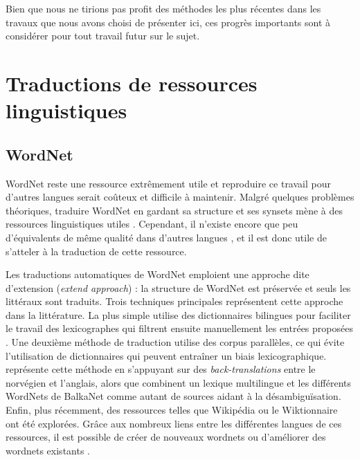 Bien que nous ne tirions pas profit des méthodes les plus récentes dans les
travaux que nous avons choisi de présenter ici, ces progrès importants sont à
considérer pour tout travail futur sur le sujet.

\section{Traductions de ressources linguistiques}
\label{sec:translation}

\subsection{WordNet}

WordNet reste une ressource extrêmement utile et reproduire ce travail pour
d'autres langues serait coûteux et difficile à maintenir. Malgré quelques
problèmes théoriques, traduire WordNet en gardant sa structure et ses synsets
mène à des ressources linguistiques utiles
\citep{fellbaum2007connecting,demelo2008utility}. Cependant, il n'existe encore
que peu d'équivalents de même qualité dans d'autres langues
\citep{bond2012survey}, et il est donc utile de s'atteler à la traduction de
cette ressource.

Les traductions automatiques de WordNet emploient une approche dite d'extension
(\textit{extend approach}) : la structure de WordNet est préservée et seuls les
littéraux sont traduits. Trois techniques principales représentent cette
approche dans la littérature. La plus simple utilise des dictionnaires
bilingues pour faciliter le travail des lexicographes qui filtrent ensuite
manuellement les entrées proposées
\citep{vossen1998eurowordnet,pianta2002developing,tufis2004balkanet}. Une
deuxième méthode de traduction utilise des corpus parallèles, ce qui évite
l'utilisation de dictionnaires qui peuvent entraîner un biais lexicographique.
\cite{dyvik2004translations} représente cette méthode en s'appuyant sur des
\textit{back-translations} entre le norvégien et l'anglais, alors que
\citep{sagot2008construction} combinent un lexique multilingue et les
différents WordNets de BalkaNet comme autant de sources aidant à la
désambiguïsation. Enfin, plus récemment, des ressources telles que Wikipédia ou
le Wiktionnaire ont été explorées. Grâce aux nombreux liens entre les
différentes langues de ces ressources, il est possible de créer de nouveaux
wordnets \citep{demelo2009towards,navigli2010babelnet} ou d'améliorer des
wordnets existants \citep{hanoka2012wordnet}.

